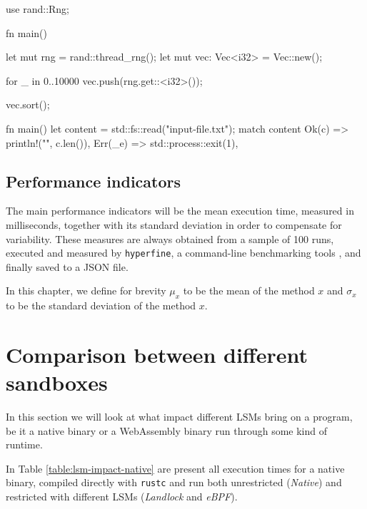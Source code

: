 \vspace*{0.5cm}
\begin{code}[language=Rust, caption=The tested ``sorting program''., label=lst:sorting-test-rust]
use rand::Rng;

fn main() {
  let mut rng = rand::thread_rng();
  let mut vec: Vec<i32> = Vec::new();

  for _ in 0..10000 {
    vec.push(rng.get::<i32>());
  }

  vec.sort();
}
\end{code}

\begin{code}[language=Rust, caption=The tested ``reading program''., label=lst:reading-test-rust]
fn main() {
  let content = std::fs::read("input-file.txt");
  match content {
      Ok(c) => println!("{}", c.len()),
      Err(_e) => std::process::exit(1),
  }
}
\end{code}

\subsection{Performance indicators}

The main performance indicators will be the mean execution time, measured in milliseconds, together with its
standard deviation in order to compensate for variability.
These measures are always obtained from a sample of 100 runs, executed and measured by \texttt{hyperfine},
a command-line benchmarking tools \cite{hyperfine}, and finally saved to a
JSON file.

In this chapter, we define for brevity $\mu_x$ to be the mean of the method $x$ and $\sigma_x$ to be
the standard deviation of the method $x$.

\section{Comparison between different sandboxes}
\label{sec:performance-comparison-between-different-sandboxes}

In this section we will look at what impact different LSMs bring on a program,
be it a native binary or a WebAssembly binary run through some kind of runtime.

In Table \ref{table:lsm-impact-native} are present all execution times for a native binary,
compiled directly with \texttt{rustc} and run both unrestricted (\textit{Native}) and restricted
with different LSMs (\textit{Landlock} and \textit{eBPF}).

